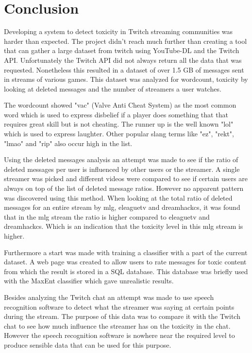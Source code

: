 \documentclass[final]{report}
\begin{document}
\chapter{Conclusion}
\label{ch:conclusion}

Developing a system to detect toxicity in Twitch streaming communities was harder than expected. The project didn't reach much further than creating a tool that can gather a large dataset from twitch using YouTube-DL and the Twitch API. Unfortunately the Twitch API did not always return all the data that was requested. Nonetheless this resulted in a dataset of over 1.5 GB of messages sent in streams of various games. This dataset was analyzed for wordcount, toxicity by looking at deleted messages and the number of streamers a user watches.

The wordcount showed "vac" (Valve Anti Cheat System) as the most common word which is used to express disbelief if a player does something that that requires great skill but is not cheating. The runner up is the well known "lol" which is used to express laughter. Other popular slang terms like "ez", "rekt", "lmao" and "rip" also occur high in the list.

Using the deleted messages analysis an attempt was made to see if the ratio of deleted messages per user is influenced by other users or the streamer. A single streamer was picked and different videos were compared to see if certain users are always on top of the list of deleted message ratios. However no apparent pattern was discovered using this method. When looking at the total ratio of deleted messages for an entire stream by mlg, eleaguetv and dreamhackcs, it was found that in the mlg stream the ratio is higher compared to eleaguetv and dreamhackcs. Which is an indication that the toxicity level in this mlg stream is higher.

Furthermore a start was made with training a classifier with a part of the current dataset. A web page was created to allow users to rate messages for toxic content from which the result is stored in a SQL database. This database was briefly used with the MaxEnt classifier which gave unrealistic results.

Besides analyzing the Twitch chat an attempt was made to use speech recognition software to detect what the streamer was saying at certain points during the stream. The purpose of this data was to compare it with the Twitch chat to see how much influence the streamer has on the toxicity in the chat. However the speech recognition software is nowhere near the required level to produce sensible data that can be used for this purpose. 
\end{document}
